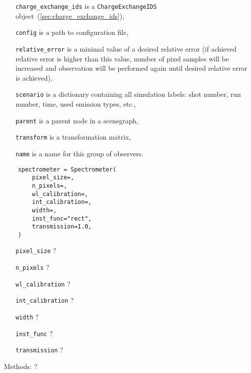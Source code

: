 \documentclass[../../main]{subfiles}
\begin{document}
\begin{itemize}[align=left]
    \item[\texttt{charge\_exchange\_ids}] is a \texttt{ChargeExchangeIDS} object~(\cref{sec:charge_exchange_ids}),
    \item[\texttt{config}] is a path to configuration file,
    \item[\texttt{relative\_error}] is a minimal value of a desired relative error (if achieved relative error is higher than this value, number of pixel samples will be increased and observation will be performed again until desired relative error is achieved),
    \item[\texttt{scenario}] is a dictionary containing all simulation labels: shot number, run number, time, used emission types, etc.,
    \item[\texttt{parent}] is a parent node in a scenegraph,
    \item[\texttt{transform}] is a transformation matrix,
    \item[\texttt{name}] is a name for this group of observers.
\end{itemize}

\begin{verbatim}
    spectrometer = Spectrometer(
        pixel_size=,
        n_pixels=,
        wl_calibration=,
        int_calibration=,
        width=,
        inst_func="rect",
        transmission=1.0,
    )
\end{verbatim}

\begin{itemize}[align=left]
    \item[\texttt{pixel\_size}] ?
    \item[\texttt{n\_pixels}] ?
    \item[\texttt{wl\_calibration}] ?
    \item[\texttt{int\_calibration}] ?
    \item[\texttt{width}] ?
    \item[\texttt{inst\_func}] ?
    \item[\texttt{transmission}] ?
\end{itemize}

Methods: ?
\end{document}
